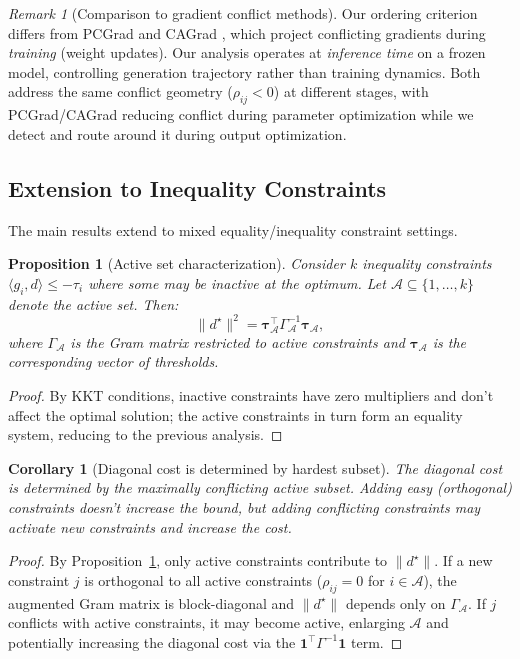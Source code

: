 \documentclass{article}
\theoremstyle{plain}
\newtheorem{proposition}[theorem]{Proposition}
\newtheorem{corollary}[theorem]{Corollary}
\theoremstyle{definition}
\theoremstyle{remark}
\newtheorem{remark}[theorem]{Remark}
\begin{document}
\begin{remark}[Comparison to gradient conflict methods]
Our ordering criterion differs from PCGrad \citep{yu2020gradient} and CAGrad \citep{liu2021cagrad}, which project conflicting gradients during \emph{training} (weight updates). Our analysis operates at \emph{inference time} on a frozen model, controlling generation trajectory rather than training dynamics. Both address the same conflict geometry ($\rho_{ij} < 0$) at different stages, with PCGrad/CAGrad reducing conflict during parameter optimization while we detect and route around it during output optimization.
\end{remark}

\subsection{Extension to Inequality Constraints}\label{app:inequality}

The main results extend to mixed equality/inequality constraint settings.

\begin{proposition}[Active set characterization]\label{prop:active}
Consider $k$ inequality constraints $\langle g_i, d \rangle \le -\tau_i$ where some may be inactive at the optimum. Let $\mathcal{A} \subseteq \{1,\ldots,k\}$ denote the active set. Then:
\[
\|d^\star\|^2 = \boldsymbol{\tau}_\mathcal{A}^\top \Gamma_\mathcal{A}^{-1} \boldsymbol{\tau}_\mathcal{A},
\]
where $\Gamma_\mathcal{A}$ is the Gram matrix restricted to active constraints and $\boldsymbol{\tau}_\mathcal{A}$ is the corresponding vector of thresholds.
\end{proposition}

\begin{proof}
By KKT conditions, inactive constraints have zero multipliers and don't affect the optimal solution; the active constraints in turn form an equality system, reducing to the previous analysis.
\end{proof}

\begin{corollary}[Diagonal cost is determined by hardest subset]\label{cor:active_set}
The diagonal cost is determined by the maximally conflicting active subset. Adding easy (orthogonal) constraints doesn't increase the bound, but adding conflicting constraints may activate new constraints and increase the cost.
\end{corollary}

\begin{proof}
By Proposition~\ref{prop:active}, only active constraints contribute to $\|d^\star\|$. If a new constraint $j$ is orthogonal to all active constraints ($\rho_{ij} = 0$ for $i \in \mathcal{A}$), the augmented Gram matrix is block-diagonal and $\|d^\star\|$ depends only on $\Gamma_\mathcal{A}$. If $j$ conflicts with active constraints, it may become active, enlarging $\mathcal{A}$ and potentially increasing the diagonal cost via the $\mathbf{1}^\top \Gamma^{-1} \mathbf{1}$ term.
\end{proof}
\end{document}
